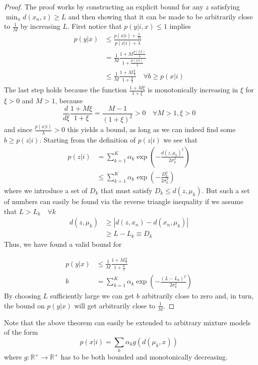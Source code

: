 \documentclass[12pt]{article}
\begin{document}
\begin{proof}
The proof works by constructing an explicit bound for any $z$ satisfying $\min_n d\left(x_n, z \right) \geq L$ and then showing that it can be made to be arbitrarily close to $\frac{1}{M}$ by increasing $L$. First notice that $p(y|i,x) \leq 1$ implies
\begin{align}
p(y|x) &\leq \frac{p(x|i) + \frac{\lambda}{M} }{p(x|i)+\lambda } \\
&= \frac{1}{M}\frac{1 + M \frac{p(x|i)}{\lambda}  }{1+ \frac{p(x|i)}{\lambda} } \\
&\leq \frac{1}{M} \frac{1 + M \frac{b}{\lambda}  }{1+\frac{b}{\lambda} } \quad \forall b\geq p(x|i)
\end{align}
The last step holds because the function $\frac{1+M \xi}{1+\xi}$ is monotonically increasing in $\xi$ for $\xi>0$ and $M>1$, because 
\begin{equation}
\frac{d}{d \xi} \frac{1+M\xi}{1+\xi} = \frac{M-1}{(1+\xi)^2} > 0 \quad \forall M>1, \xi>0
\end{equation}
and since $\frac{p(x|i)}{\lambda}>0$ this yields a bound, as long as we can indeed find some $b\geq p(z|i)$. Starting from the definition of $p(z|i)$ we see that
\begin{align}
p(z|i) &= \sum_{k=1}^K \alpha_k\exp \left( -\frac{d(z,\mu_k)^2}{2\sigma_k^2}\right) \\
&\leq  \sum_{k=1}^K \alpha_k \exp \left( -\frac{D_k^2}{2\sigma_k^2}\right) 
\end{align}
where we introduce a set of $D_k$ that must satisfy $D_k \leq d\left(z,\mu_k\right)$. But such a set of numbers can easily be found via the reverse triangle inequality if we assume that $L>L_k \quad \forall k$
\begin{align}
d(z,\mu_k) &\geq \left|d(z,x_n) - d(x_n,\mu_k) \right| \\
&\geq L-L_k \equiv D_k
\end{align}
Thus, we have found a valid bound for 

\begin{align}
p(y|x) &\leq \frac{1}{M} \frac{1 + M \frac{b}{\lambda}  }{1+\frac{b}{\lambda} } \\
b &= \sum_{k=1}^K \alpha_k \exp \left( -\frac{(L-L_k)^2}{2\sigma_k^2}\right) 
\end{align}
By choosing $L$ sufficiently large we can get $b$ arbitrarily close to zero and, in turn, the bound on $p(y|x)$ will get arbitrarily close to $\frac{1}{M}$.

\end{proof}
Note that the above theorem can easily be extended to arbitrary mixture models of the form
\begin{equation}
p(x|i) = \sum_k \alpha_k g\left(d(\mu_k, x) \right)
\end{equation}
where $g:\mathbb{R}^+ \rightarrow \mathbb{R}^+$ has to be both bounded and monotonically decreasing.
\end{document}
